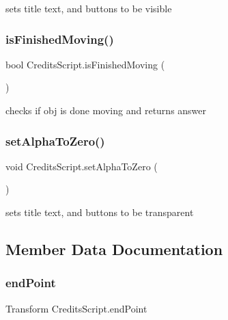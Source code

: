 sets title text, and buttons to be visible 

\mbox{\label{class_credits_script_ae63ab5451f32c82bda6068facad2a213}} 
\subsubsection{\texorpdfstring{is\+Finished\+Moving()}{isFinishedMoving()}}
{\footnotesize\ttfamily bool Credits\+Script.\+is\+Finished\+Moving (\begin{DoxyParamCaption}{ }\end{DoxyParamCaption})}



checks if obj is done moving and returns answer 

\mbox{\label{class_credits_script_a6a5a4968b3661e7f2ff3b609c3584957}} 
\subsubsection{\texorpdfstring{set\+Alpha\+To\+Zero()}{setAlphaToZero()}}
{\footnotesize\ttfamily void Credits\+Script.\+set\+Alpha\+To\+Zero (\begin{DoxyParamCaption}{ }\end{DoxyParamCaption})}



sets title text, and buttons to be transparent 



\subsection{Member Data Documentation}
\mbox{\label{class_credits_script_a1a7ba480a06d7f8bccdb07212e23c6c5}} 
\subsubsection{\texorpdfstring{end\+Point}{endPoint}}
{\footnotesize\ttfamily Transform Credits\+Script.\+end\+Point}

